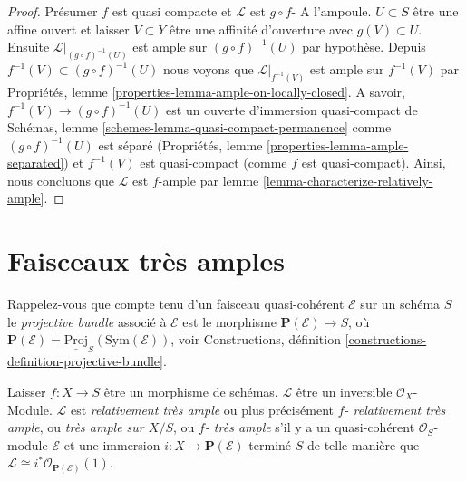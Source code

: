 \begin{proof}

Présumer $f$ est quasi compacte et $\mathcal{L}$ est $g \circ f$- A l'ampoule. $U \subset S$ être une affine ouvert et laisser $V \subset Y$ être une affinité d'ouverture avec $g(V) \subset U$. Ensuite $\mathcal{L}|_{(g \circ f)^{-1}(U)}$ est ample sur
$(g \circ f)^{-1}(U)$ par hypothèse. Depuis $f^{-1}(V) \subset (g \circ f)^{-1}(U)$ nous voyons que
$\mathcal{L}|_{f^{-1}(V)}$ est ample sur $f^{-1}(V)$ par Propriétés, lemme \ref{properties-lemma-ample-on-locally-closed}. A savoir, $f^{-1}(V) \to (g \circ f)^{-1}(U)$ est un ouverte d'immersion quasi-compact de Schémas, lemme \ref{schemes-lemma-quasi-compact-permanence}
comme $(g \circ f)^{-1}(U)$ est séparé (Propriétés, lemme \ref{properties-lemma-ample-separated}) et $f^{-1}(V)$ est quasi-compact (comme $f$ est quasi-compact). Ainsi, nous concluons que $\mathcal{L}$ est $f$-ample par lemme \ref{lemma-characterize-relatively-ample}.

\end{proof}







\section{Faisceaux très amples}
\label{section-very-ample}

\noindent
Rappelez-vous que compte tenu d'un faisceau quasi-cohérent $\mathcal{E}$ sur un schéma $S$ le {\it projective bundle} associé à $\mathcal{E}$ est le morphisme $\mathbf{P}(\mathcal{E}) \to S$, où $\mathbf{P}(\mathcal{E}) = \underline{\text{Proj}}_S(\text{Sym}(\mathcal{E}))$, voir Constructions, définition \ref{constructions-definition-projective-bundle}.

\begin{definition}

\label{definition-very-ample}

Laisser $f : X \to S$ être un morphisme de schémas. $\mathcal{L}$ être un inversible $\mathcal{O}_X$- Module. $\mathcal{L}$ est {\it relativement très ample} ou plus précisément {\it  $f$- relativement très ample}, ou {\it très ample sur $X/S$}, ou {\it  $f$- très ample} s'il y a un quasi-cohérent $\mathcal{O}_S$-module
$\mathcal{E}$ et une immersion $i : X \to \mathbf{P}(\mathcal{E})$
terminé $S$ de telle manière que
$\mathcal{L} \cong i^*\mathcal{O}_{\mathbf{P}(\mathcal{E})}(1)$.

\end{definition}




